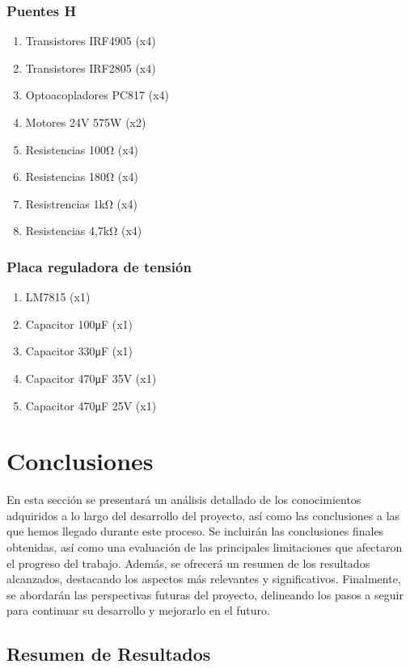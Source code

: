 \documentclass{article}
\begin{document}
\subsubsection{Puentes H}
\begin{enumerate}
    \item Transistores IRF4905 (x4)
    \item Transistores IRF2805 (x4)
    \item Optoacopladores PC817 (x4)
    \item Motores 24V 575W (x2)
    \item Resistencias 100Ω (x4)
    \item Resistencias 180Ω (x4)
    \item Resistrencias 1kΩ (x4)
    \item Resistencias 4,7kΩ (x4)
\end{enumerate}

\subsubsection{Placa reguladora de tensión}
\begin{enumerate}
    \item LM7815 (x1)
    \item Capacitor 100μF (x1)
    \item Capacitor 330μF (x1)
    \item Capacitor 470μF 35V (x1)
    \item Capacitor 470μF 25V (x1)
\end{enumerate}

\section{Conclusiones}
En esta sección se presentará un análisis detallado de los conocimientos adquiridos a lo largo del desarrollo del proyecto, así como las conclusiones a las que hemos llegado durante este proceso. Se incluirán las conclusiones finales obtenidas, así como una evaluación de las principales limitaciones que afectaron el progreso del trabajo. Además, se ofrecerá un resumen de los resultados alcanzados, destacando los aspectos más relevantes y significativos. Finalmente, se abordarán las perspectivas futuras del proyecto, delineando los pasos a seguir para continuar su desarrollo y mejorarlo en el futuro.


\subsection{Resumen de Resultados}
\end{document}
